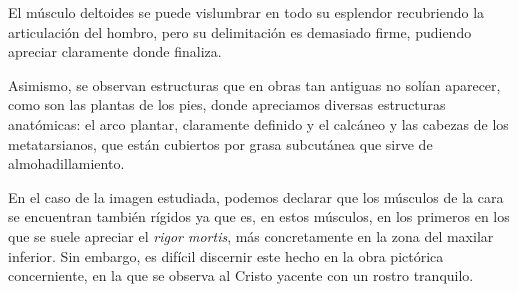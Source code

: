 El músculo deltoides se puede vislumbrar en todo su esplendor recubriendo la articulación del hombro, pero su delimitación es demasiado firme, pudiendo apreciar claramente donde finaliza.

Asimismo, se observan estructuras que en obras tan antiguas no solían aparecer, como son las plantas de los pies, donde apreciamos diversas estructuras anatómicas: el arco plantar, claramente definido y el calcáneo y las cabezas de los metatarsianos, que están cubiertos por grasa subcutánea que sirve de almohadillamiento.

 En el caso de la imagen estudiada, podemos declarar que los músculos de la cara se encuentran también rígidos ya que es, en estos músculos, en los primeros en los que se suele apreciar el \textit{rigor mortis}, más concretamente en la zona del maxilar inferior. Sin embargo, es difícil discernir este hecho en la obra pictórica concerniente, en la que se observa al Cristo yacente con un rostro tranquilo.
